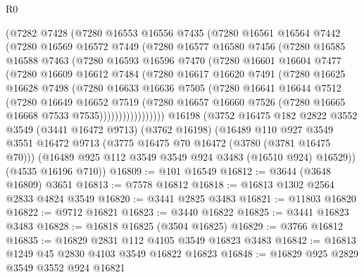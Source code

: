\begin{lexlean}{R0}
\begin{coremodule}
      (@7282
        @7428
        (@7280
          @16553
          @16556
          @7435
          (@7280
            @16561
            @16564
            @7442
            (@7280
              @16569
              @16572
              @7449
              (@7280
                @16577
                @16580
                @7456
                (@7280
                  @16585
                  @16588
                  @7463
                  (@7280
                    @16593
                    @16596
                    @7470
                    (@7280
                      @16601
                      @16604
                      @7477
                      (@7280
                        @16609
                        @16612
                        @7484
                        (@7280
                          @16617
                          @16620
                          @7491
                          (@7280
                            @16625
                            @16628
                            @7498
                            (@7280
                              @16633
                              @16636
                              @7505
                              (@7280
                                @16641
                                @16644
                                @7512
                                (@7280
                                  @16649
                                  @16652
                                  @7519
                                  (@7280
                                    @16657
                                    @16660
                                    @7526
                                    (@7280 @16665 @16668 @7533 @7535)))))))))))))))))
    @16198
    (@3752
      @16475
      @182
      @2822
      @3552
      @3549
      (@3441 @16472 @9713)
      (@3762 @16198)
      (@16489
        @110
        @927
        @3549
        @3551
        @16472
        @9713
        (@3775 @16475 @70 @16472 (@3780 (@3781 @16475 @70)))
        (@16489 @925 @112 @3549 @3549 @924 @3483 (@16510 @924) @16529))
      (@4535 @16196 @710))
@16809 := @101 @16549
@16812 := @3644 (@3648 @16809) @3651
@16813 := @7578 @16812
@16818 := @16813 @1302 @2564 @2833 @4824 @3549
@16820 := @3441 @2825 @3483
@16821 := @11803 @16820
@16822 := @9712 @16821
@16823 := @3440 @16822
@16825 := @3441 @16823 @3483
@16828 := @16818 @16825 (@3504 @16825)
@16829 := @3766 @16812
@16835 := @16829 @2831 @112 @4105 @3549 @16823 @3483
@16842 := @16813 @1249 @45 @2830 @4103 @3549 @16822 @16823
@16848 := @16829 @925 @2829 @3549 @3552 @924 @16821

\end{coremodule}
\end{lexlean}
